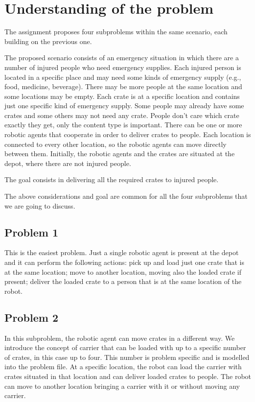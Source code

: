 
\section{Understanding of the problem}
\label{sec2}

The assignment proposes four subproblems within the same scenario, each building on the previous one.

The proposed scenario consists of an emergency situation in which there are a number of injured people 
who need emergency supplies.
Each injured person is located in a specific place and may need some kinds of emergency supply
(e.g., food, medicine, beverage). There may be more people at the same location and some 
locations may be empty.
Each crate is at a specific location and contains just one specific kind of emergency supply.
Some people may already have some crates and some others may not need any crate.
People don't care which crate exactly they get, only the content type is important.
There can be one or more robotic agents that cooperate in order to deliver crates to people.
Each location is connected to every other location, so the robotic agents can move directly between them.
Initially, the robotic agents and the crates are situated at the depot, where there are not injured people.

The goal consists in delivering all the required crates to injured people.

The above considerations and goal are common for all the four subproblems that we are going to discuss.

\subsection{Problem 1}
This is the easiest problem.
Just a single robotic agent is present at the depot and it can perform the following actions: 
pick up and load just one crate that is at the same location;
move to another location, moving also the loaded crate if present; 
deliver the loaded crate to a person that is at the same location of the robot.

\subsection{Problem 2}
In this subproblem, the robotic agent can move crates in a different way.
We introduce the concept of carrier that can be loaded with up to a specific number of crates, 
in this case up to four.
This number is problem specific and is modelled into the problem file.
At a specific location, the robot can load the carrier with crates situated in that location and can
deliver loaded crates to people.
The robot can move to another location bringing a carrier with it or without moving any carrier.

